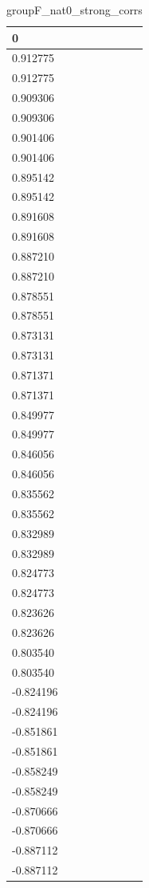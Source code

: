 \begin{table}
\caption{groupF_nat0_strong_corrs}
\label{tab:groupF_nat0_strong_corrs}
\begin{tabular}{lcr}
\toprule
0 \\
\midrule
0.912775 \\
0.912775 \\
0.909306 \\
0.909306 \\
0.901406 \\
0.901406 \\
0.895142 \\
0.895142 \\
0.891608 \\
0.891608 \\
0.887210 \\
0.887210 \\
0.878551 \\
0.878551 \\
0.873131 \\
0.873131 \\
0.871371 \\
0.871371 \\
0.849977 \\
0.849977 \\
0.846056 \\
0.846056 \\
0.835562 \\
0.835562 \\
0.832989 \\
0.832989 \\
0.824773 \\
0.824773 \\
0.823626 \\
0.823626 \\
0.803540 \\
0.803540 \\
-0.824196 \\
-0.824196 \\
-0.851861 \\
-0.851861 \\
-0.858249 \\
-0.858249 \\
-0.870666 \\
-0.870666 \\
-0.887112 \\
-0.887112 \\
\bottomrule
\end{tabular}
\end{table}
